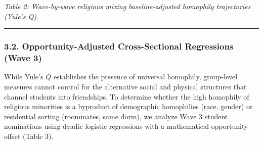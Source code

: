 \documentclass[
  letterpaper,
  DIV=11,
  numbers=noendperiod]{scrartcl}
\begin{document}
\emph{Table 2: Wave-by-wave religious mixing baseline-adjusted homophily
trajectories (Yule's Q).}

\begin{center}\rule{0.5\linewidth}{0.5pt}\end{center}

\subsubsection{3.2. Opportunity-Adjusted Cross-Sectional Regressions
(Wave 3)}\label{opportunity-adjusted-cross-sectional-regressions-wave-3}

While Yule's \(Q\) establishes the presence of universal homophily,
group-level measures cannot control for the alternative social and
physical structures that channel students into friendships. To determine
whether the high homophily of religious minorities is a byproduct of
demographic homophilies (race, gender) or residential sorting
(roommates, same dorm), we analyze Wave 3 student nominations using
dyadic logistic regressions with a mathematical opportunity offset
(Table 3).
\end{document}
